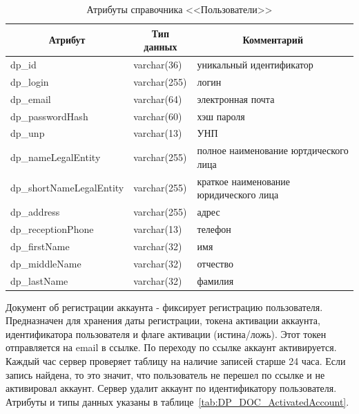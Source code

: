 \begin{table}[!htb]
    \centering\small

    \caption{Атрибуты справочника <<Пользователи>>}
    \label{tab:DP_CTL_Users}
    
    \begin{tabular}{|p{5cm}|p{2.5cm}|p{9cm}|}
        \hline
        \multicolumn{1}{|c|}{Атрибут}
        & \multicolumn{1}{c|}{Тип данных}
        & \multicolumn{1}{c|}{Комментарий}
        \\ \hline

        dp\_id & varchar(36) & уникальный идентификатор \\ \hline
        dp\_login & varchar(255) & логин \\ \hline
        dp\_email & varchar(64) & электронная почта \\ \hline
        dp\_passwordHash & varchar(60) & хэш пароля \\ \hline
        dp\_unp & varchar(13) & УНП \\ \hline
        dp\_nameLegalEntity & varchar(255) & полное наименование юртдического лица \\ \hline
        dp\_shortNameLegalEntity & varchar(255) & краткое наименование юридического лица \\ \hline
        dp\_address & varchar(255) & адрес \\ \hline
        dp\_receptionPhone & varchar(13) & телефон \\ \hline
        dp\_firstName & varchar(32) & имя \\ \hline
        dp\_middleName & varchar(32) & отчество \\ \hline
        dp\_lastName & varchar(32) & фамилия \\ \hline
    \end{tabular}
\end{table}

\newpage

Документ об регистрации аккаунта -
фиксирует регистрацию пользователя. Предназначен для хранения даты регистрации,
токена активации аккаунта, идентификатора пользователя и флаге активации (истина/ложь).
Этот токен отправляется на email в ссылке. По переходу по ссылке аккаунт активируется.
Каждый час сервер проверяет таблицу на наличие записей старше 24 часа.
Если запись найдена, то это значит, что пользователь не перешел по ссылке и не активировал аккаунт.
Сервер удалит аккаунт по идентификатору пользователя.
Атрибуты и типы данных указаны в таблице~\ref{tab:DP_DOC_ActivatedAccount}.

